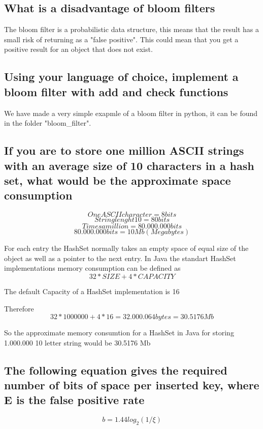 \documentclass{article}
\begin{document}
\subsection{What is a disadvantage of bloom filters}
The bloom filter is a  probabilistic data structure, this means that the result has a small 
risk of returning as a "false positive". This could mean that you get a positive result 
for an object that does not exist.

\subsection{Using your language of choice, implement a bloom filter with add and check functions}
We have made a very simple exapmle of a bloom filter in python, it can be found in the folder "bloom\_filter".

\subsection{If you are to store one million ASCII strings with an average size of 10 characters in a hash set, what would be the approximate space consumption}

\[ One ASCII character = 8 bits \] 
\newline
\[ String lenght 10 = 80 bits \]
\newline
\[ Times a million = 80.000.000 bits \]
\newline
\[ 80.000.000 bits = 10 Mb (Megabytes) \]

For each entry the HashSet normally takes an empty space of equal 
size of the object as well as a pointer to the next entry.  
In Java the standart HashSet implementations memory consumption 
can be defined as \[ 32 * SIZE + 4 * CAPACITY \]

The default Capacity of a HashSet implementation is 16

Therefore \[ 32*1000000+4*16 = 32.000.064 bytes = 30.5176 Mb \]

So the approximate memory consumtion for a HashSet in Java 
for storing 1.000.000 10 letter string would be 30.5176 Mb

\subsection{The following equation gives the required number of bits of space per inserted key, where E is the false positive rate}
\label{section:equation}
\[ b = 1.44log_2(1/\xi)\]
\end{document}
